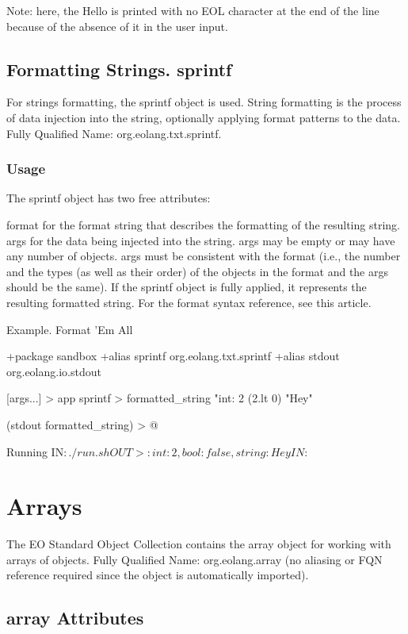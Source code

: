 \documentclass[12pt]{book}
\begin{document}
Note: here, the Hello is printed with no EOL character at the end of the line because of the absence of it in the user input.

\subsection{Formatting Strings. sprintf}
For strings formatting, the sprintf object is used.
String formatting is the process of data injection into the string, optionally applying format patterns to the data.
Fully Qualified Name: org.eolang.txt.sprintf.

\subsubsection{Usage}
The sprintf object has two free attributes:

format for the format string that describes the formatting of the resulting string.
args for the data being injected into the string. args may be empty or may have any number of objects. args must be consistent with the format (i.e., the number and the types (as well as their order) of the objects in the format and the args should be the same).
If the sprintf object is fully applied, it represents the resulting formatted string.
For the format syntax reference, see this article.

Example. Format 'Em All
\begin{ffcode}
+package sandbox
+alias sprintf org.eolang.txt.sprintf
+alias stdout org.eolang.io.stdout

[args...] > app
  sprintf > formatted_string
    "int: %
    2
    (2.lt 0)
    "Hey"

  (stdout formatted_string) > @

Running
IN$: ./run.sh
OUT>: int: 2, bool: false, string: Hey
IN$: 
\end{ffcode}


\section{Arrays}
The EO Standard Object Collection contains the array object for working with arrays of objects.
Fully Qualified Name: org.eolang.array (no aliasing or FQN reference required since the object is automatically imported).

\subsection{array Attributes}
\end{document}
